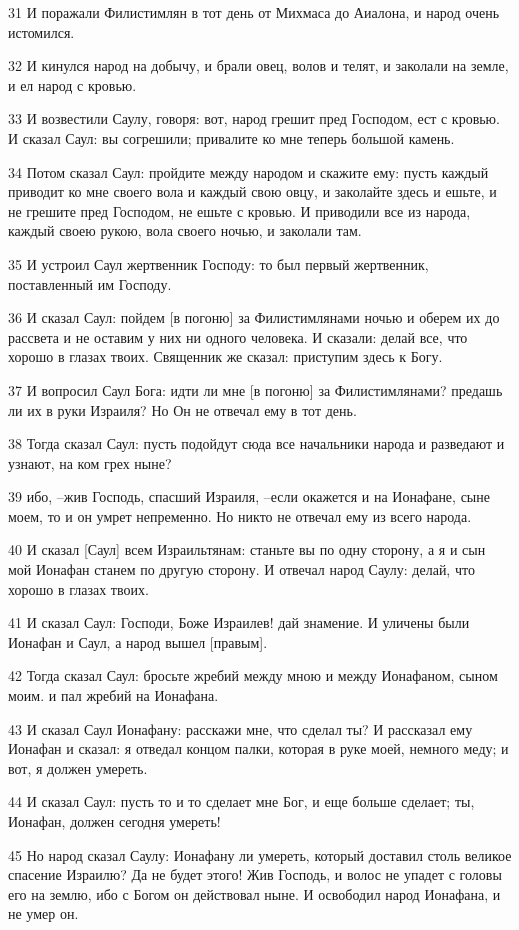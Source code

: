\par 31 И поражали Филистимлян в тот день от Михмаса до Аиалона, и народ очень истомился.
\par 32 И кинулся народ на добычу, и брали овец, волов и телят, и заколали на земле, и ел народ с кровью.
\par 33 И возвестили Саулу, говоря: вот, народ грешит пред Господом, ест с кровью. И сказал Саул: вы согрешили; привалите ко мне теперь большой камень.
\par 34 Потом сказал Саул: пройдите между народом и скажите ему: пусть каждый приводит ко мне своего вола и каждый свою овцу, и заколайте здесь и ешьте, и не грешите пред Господом, не ешьте с кровью. И приводили все из народа, каждый своею рукою, вола своего ночью, и заколали там.
\par 35 И устроил Саул жертвенник Господу: то был первый жертвенник, поставленный им Господу.
\par 36 И сказал Саул: пойдем [в погоню] за Филистимлянами ночью и оберем их до рассвета и не оставим у них ни одного человека. И сказали: делай все, что хорошо в глазах твоих. Священник же сказал: приступим здесь к Богу.
\par 37 И вопросил Саул Бога: идти ли мне [в погоню] за Филистимлянами? предашь ли их в руки Израиля? Но Он не отвечал ему в тот день.
\par 38 Тогда сказал Саул: пусть подойдут сюда все начальники народа и разведают и узнают, на ком грех ныне?
\par 39 ибо, --жив Господь, спасший Израиля, --если окажется и на Ионафане, сыне моем, то и он умрет непременно. Но никто не отвечал ему из всего народа.
\par 40 И сказал [Саул] всем Израильтянам: станьте вы по одну сторону, а я и сын мой Ионафан станем по другую сторону. И отвечал народ Саулу: делай, что хорошо в глазах твоих.
\par 41 И сказал Саул: Господи, Боже Израилев! дай знамение. И уличены были Ионафан и Саул, а народ вышел [правым].
\par 42 Тогда сказал Саул: бросьте жребий между мною и между Ионафаном, сыном моим. и пал жребий на Ионафана.
\par 43 И сказал Саул Ионафану: расскажи мне, что сделал ты? И рассказал ему Ионафан и сказал: я отведал концом палки, которая в руке моей, немного меду; и вот, я должен умереть.
\par 44 И сказал Саул: пусть то и то сделает мне Бог, и еще больше сделает; ты, Ионафан, должен сегодня умереть!
\par 45 Но народ сказал Саулу: Ионафану ли умереть, который доставил столь великое спасение Израилю? Да не будет этого! Жив Господь, и волос не упадет с головы его на землю, ибо с Богом он действовал ныне. И освободил народ Ионафана, и не умер он.
